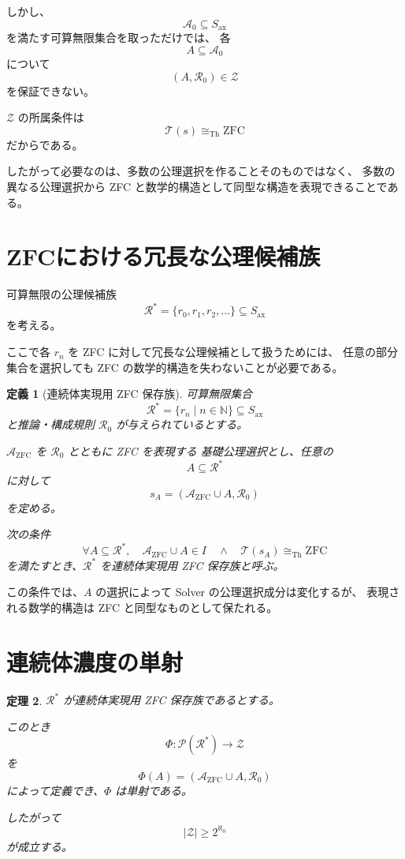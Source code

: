 \documentclass[a4paper,11pt]{article}
\newtheorem{definition}{定義}[section]
\newtheorem{theorem}[definition]{定理}
\newcommand{\Ax}{S_{\mathrm{ax}}}
\begin{document}
しかし、
\[
\mathcal{A}_0\subseteq\Ax
\]
を満たす可算無限集合を取っただけでは、
各
\[
A\subseteq\mathcal{A}_0
\]
について
\[
(A,\mathcal{R}_0)\in\mathcal{Z}
\]
を保証できない。

$\mathcal{Z}$ の所属条件は
\[
\mathcal{T}(s)\cong_{\mathrm{Th}}\mathrm{ZFC}
\]
だからである。

したがって必要なのは、多数の公理選択を作ることそのものではなく、
多数の異なる公理選択から ZFC と数学的構造として同型な構造を表現できることである。

\section{ZFCにおける冗長な公理候補族}

可算無限の公理候補族
\[
\mathcal{R}^*=\{r_0,r_1,r_2,\ldots\}\subseteq\Ax
\]
を考える。

ここで各 $r_n$ を ZFC に対して冗長な公理候補として扱うためには、
任意の部分集合を選択しても ZFC の数学的構造を失わないことが必要である。

\begin{definition}[連続体実現用 ZFC 保存族]
可算無限集合
\[
\mathcal{R}^*=\{r_n\mid n\in\mathbb{N}\}\subseteq\Ax
\]
と推論・構成規則 $\mathcal{R}_0$ が与えられているとする。

$\mathcal{A}_{\mathrm{ZFC}}$ を $\mathcal{R}_0$ とともに ZFC を表現する
基礎公理選択とし、任意の
\[
A\subseteq\mathcal{R}^*
\]
に対して
\[
s_A=
\left(
\mathcal{A}_{\mathrm{ZFC}}\cup A,\mathcal{R}_0
\right)
\]
を定める。

次の条件
\[
\boxed{
\forall A\subseteq\mathcal{R}^*,
\quad
\mathcal{A}_{\mathrm{ZFC}}\cup A\in I
\quad\land\quad
\mathcal{T}(s_A)\cong_{\mathrm{Th}}\mathrm{ZFC}
}
\]
を満たすとき、$\mathcal{R}^*$ を連続体実現用 ZFC 保存族と呼ぶ。
\end{definition}

この条件では、$A$ の選択によって Solver の公理選択成分は変化するが、
表現される数学的構造は ZFC と同型なものとして保たれる。

\section{連続体濃度の単射}

\begin{theorem}
$\mathcal{R}^*$ が連続体実現用 ZFC 保存族であるとする。

このとき
\[
\Phi:\mathcal{P}(\mathcal{R}^*)\to\mathcal{Z}
\]
を
\[
\boxed{
\Phi(A)=
\left(
\mathcal{A}_{\mathrm{ZFC}}\cup A,\mathcal{R}_0
\right)
}
\]
によって定義でき、$\Phi$ は単射である。

したがって
\[
\boxed{
|\mathcal{Z}|\geq2^{\aleph_0}
}
\]
が成立する。
\end{theorem}
\end{document}
